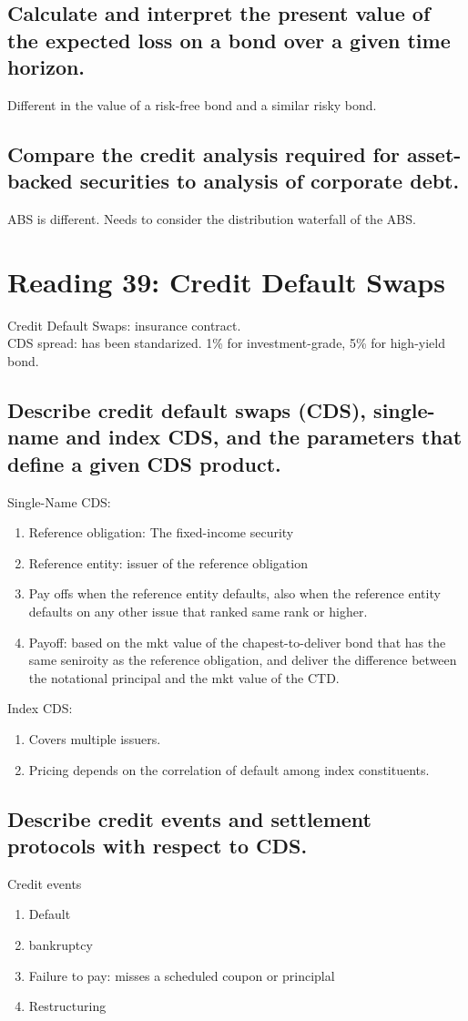 \documentclass{article}
\newcommand{\be}{\begin{enumerate}}
\newcommand{\ee}{\end{enumerate}}
\begin{document}
\subsection{Calculate and interpret the present value of the expected loss on a bond
over a given time horizon.}
Different in the value of a risk-free bond and a similar risky bond.
\subsection{Compare the credit analysis required for asset-backed securities to analysis
of corporate debt.}
ABS is different. Needs to consider the distribution waterfall of the ABS.

\section{Reading 39: Credit Default Swaps}
Credit Default Swaps: insurance contract.
\\CDS spread: has been standarized. 1\% for investment-grade, 5\% for high-yield bond.
\subsection{Describe credit default swaps (CDS), single-name and index CDS, and
the parameters that define a given CDS product.}
Single-Name CDS:
\be
    \item Reference obligation: The fixed-income security
    \item Reference entity: issuer of the reference obligation
    \item Pay offs when the reference entity defaults, also when the reference entity
    defaults on any other issue that ranked same rank or higher.
    \item Payoff: based on the mkt value of the chapest-to-deliver bond that has the
    same seniroity as the reference obligation, and deliver the difference between the
    notational principal and the mkt value of the CTD.
\ee
Index CDS:
\be
    \item Covers multiple issuers.
    \item Pricing depends on the correlation of default among index constituents.
\ee
\subsection{Describe credit events and settlement protocols with respect to CDS.}
Credit events
\be
    \item Default
    \item bankruptcy
    \item Failure to pay: misses a scheduled coupon or principlal
    \item Restructuring
\ee
\end{document}
